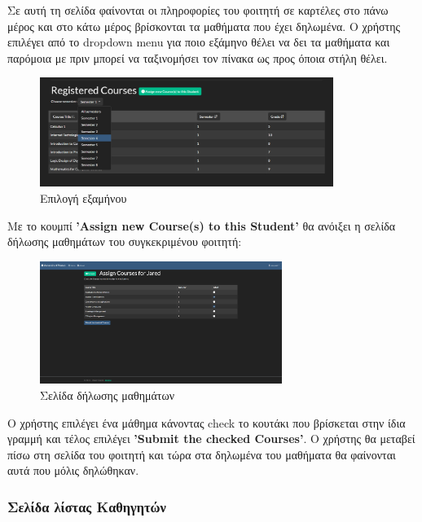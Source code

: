 \documentclass[12pt]{article}
\begin{document}
\begin{enumerate}
		Σε αυτή τη σελίδα φαίνονται οι πληροφορίες του φοιτητή σε καρτέλες στο πάνω μέρος και στο κάτω μέρος βρίσκονται τα μαθήματα που έχει δηλωμένα. Ο χρήστης επιλέγει από το dropdown menu για ποιο εξάμηνο θέλει να δει τα μαθήματα και παρόμοια με πριν μπορεί να ταξινομήσει τον πίνακα ως προς όποια στήλη θέλει.
		
		\begin{figure}[H]
			\centering
			\includegraphics[width=0.85\textwidth]{sems.png}
			\caption{Επιλογή εξαμήνου}
			\label{fig:emptyView}
		\end{figure}
	
		Με το κουμπί \textbf{'Assign new Course(s) to this Student'} θα ανόιξει η σελίδα δήλωσης μαθημάτων του συγκεκριμένου φοιτητή:
		
		\begin{figure}[H]
			\centering
			\includegraphics[width=0.7\textwidth]{newless.png}
			\caption{Σελίδα δήλωσης μαθημάτων}
			\label{fig:emptyView}
		\end{figure}
	
		Ο χρήστης επιλέγει ένα μάθημα κάνοντας check το κουτάκι που βρίσκεται στην ίδια γραμμή και τέλος επιλέγει \textbf{'Submit the checked Courses'}. Ο χρήστης θα μεταβεί πίσω στη σελίδα του φοιτητή και τώρα στα δηλωμένα του μαθήματα θα φαίνονται αυτά που μόλις δηλώθηκαν.
	\end{enumerate}


	
	\subsubsection{Σελίδα λίστας Καθηγητών}
\end{document}
